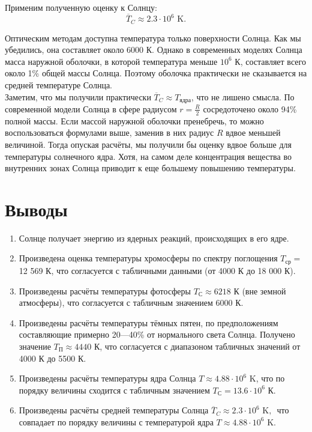 \documentclass[a4paper,12pt]{article}
\begin{document}
Применим полученную оценку к Солнцу:
\[
\overline{T}_C \approx 2.3\cdot 10^6\text{ K}.
\]

Оптическим методам доступна температура только поверхности Солнца. Как мы убедились, она составляет около $6000$ К. Однако в современных моделях Солнца масса наружной оболочки, в которой температура меньше $10^6$ К, составляет всего около 1\% общей массы Солнца. Поэтому оболочка практически не сказывается на средней температуре Солнца.\\

Заметим, что мы получили практически $\overline{T}_C \approx T_{\text{ядра}}$, что не лишено смысла. По современной модели Солнца в сфере радиусом $r = \frac{R}{2}$ сосредоточено около 94\% полной массы. Если массой наружной оболочки пренебречь, то можно воспользоваться формулами выше, заменив в них радиус $R$ вдвое меньшей величиной. Тогда опуская расчёты, мы получили бы оценку вдвое больше для температуры солнечного ядра. Хотя, на самом деле концентрация вещества во внутренних зонах Солнца приводит к еще большему повышению температуры.

\newpage
\section*{Выводы}
\begin{enumerate}
    \item Солнце получает энергию из ядерных реакций, происходящих в его ядре.
    \item Произведена оценка температуры хромосферы по спектру поглощения 
$T_{\text{ср}} = $ 12 569 К, что согласуется с табличными данными (от 4000 К до 18 000 К).
    \item Произведены расчёты температуры фотосферы $T_{\text{С}} \approx 6218 \text{ К}$ (вне земной атмосферы), что согласуется с табличным значением 6000 К.
    \item Произведены расчёты температуры тёмных пятен, по предположениям составляющие примерно 20---40\% от нормального света Солнца. Получено значение $T_{\text{П}} \approx 4440 \text{ К}$, что согласуется с диапазоном табличных значений от 4000 К до 5500 К.
    \item Произведены расчёты температуры ядра Солнца  $T \approx 4.88 \cdot 10^6\text{ K}$, что по порядку величины сходится с табличным значением $T_{\text{С}} = 13.6 \cdot 10^6 \text{ К}$.
    \item Произведены расчёты средней температуры Солнца $\overline{T}_C \approx 2.3\cdot 10^6\text{ K, }$ что совпадает по порядку величины с температурой ядра $T\approx 4.88\cdot10^6\text{ K}.$
\end{enumerate}
\end{document}
